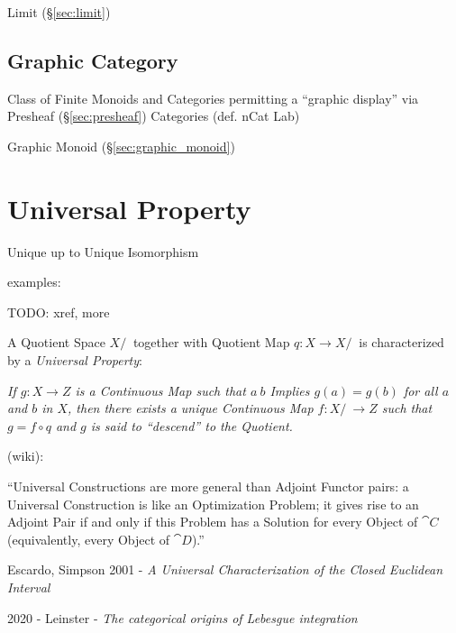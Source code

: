 Limit (\S\ref{sec:limit})



\subsection{Graphic Category}\label{sec:graphic_category}

Class of Finite Monoids and Categories permitting a ``graphic
display'' via Presheaf (\S\ref{sec:presheaf}) Categories
(def. nCat Lab) %

Graphic Monoid (\S\ref{sec:graphic_monoid})



\section{Universal Property}\label{sec:universal_property}

Unique up to Unique Isomorphism

examples:

TODO: xref, more

A Quotient Space $X/~$ together with Quotient Map $q : X \rightarrow X/~$ is
characterized by a \emph{Universal Property}:

\emph{If $g : X \rightarrow Z$ is a Continuous Map such that $a ~ b$ Implies $g(a)
  = g(b)$ for all $a$ and $b$ in $X$, then there exists a unique Continuous Map
  $f : X/~ \rightarrow Z$ such that $g = f \circ q$ and $g$ is said to
  ``descend'' to the Quotient.}

(wiki):

``Universal Constructions are more general than Adjoint Functor pairs: a
Universal Construction is like an Optimization Problem; it gives rise to an
Adjoint Pair if and only if this Problem has a Solution for every Object of
$\cat{C}$ (equivalently, every Object of $\cat{D}$).''

\asterism

Escardo, Simpson 2001 -
\emph{A Universal Characterization of the Closed Euclidean Interval}

\asterism

2020 - Leinster - \emph{The categorical origins of Lebesgue integration}

